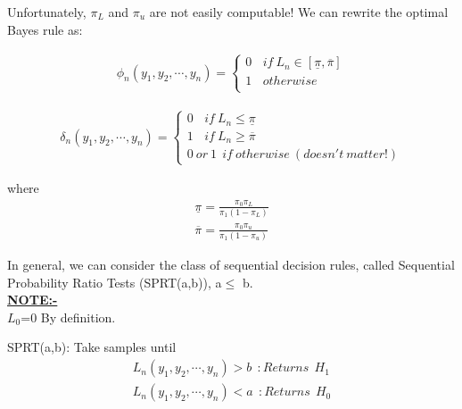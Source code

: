 \documentclass[12pt]{report}
\begin{document}
\noindent Unfortunately, $\pi_L$ and $\pi_u$ are not easily computable!\newline
We can rewrite the optimal Bayes rule as:\newline

\begin{eqnarray}
\phi_n(y_1,y_2,\cdots,y_n) =  
\begin{cases}
0 \ \ \ \ if \ L_n\in [\underline{\pi},\overline{\pi}] \\
1 \ \ \ \ otherwise\\
\end{cases}
\end{eqnarray}

\begin{eqnarray}
\delta_n(y_1,y_2,\cdots,y_n) =  
\begin{cases}
0 \ \ \ \ if \ L_n\leq \underline{\pi} \\
1 \ \ \ \ if \ L_n \geq\overline{\pi} \\
0 \ or \ 1 \ \ if \ otherwise\ (doesn't \ matter!)
\end{cases}
\end{eqnarray}

where\newline
\begin{eqnarray}
\underline{\pi}=\frac{\pi_0\pi_L}{\pi_1(1-\pi_L)}\\
\overline{\pi}=\frac{\pi_0\pi_u}{\pi_1(1-\pi_u)}
\end{eqnarray}

In general, we can consider the class of sequential decision rules, called Sequential Probability Ratio Tests (SPRT(a,b)), a$\leq$ b.\\\newline
\noindent \textbf{\underline{NOTE:-}} \nonumber\\

$L_0$=0 By definition.\newline

SPRT(a,b): Take samples until\newline
\begin{eqnarray}
L_n(y_1,y_2,\cdots,y_n)>b \ \ : Returns \ \ H_1\\ 
L_n(y_1,y_2,\cdots,y_n)<a \ \ : Returns \ \ H_0
\end{eqnarray}
\end{document}
